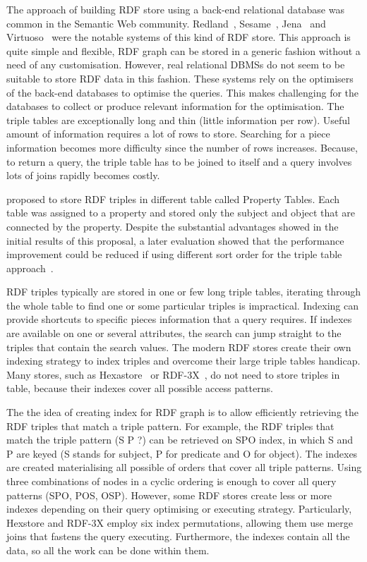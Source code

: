 {The approach of building RDF store using a back-end relational database was common in the Semantic Web community. 
Redland~\citep{Beckett:2001}, Sesame~\citep{Broekstra:2002}, Jena~\citep{Wilkinson:2003} and Virtuoso~\citep{Erling:2009} were the notable systems of this kind of RDF store.
This approach is quite simple and flexible, RDF graph can be stored in a generic fashion without a need of any customisation.
However, real relational DBMSs do not seem to be suitable to store RDF data in this fashion.
These systems rely on the optimisers of the back-end databases to optimise the queries.
This makes challenging for the databases to collect or produce relevant information for the optimisation.
The triple tables are exceptionally long and thin (little information per row). 
Useful amount of information requires a lot of rows to store.
Searching for a piece information becomes more difficulty since the number of rows increases.
Because, to return a query, the triple table has to be joined to itself and a query involves lots of joins rapidly becomes costly.

\cite{Abadi:2007} proposed to store RDF triples in different table called Property Tables.
Each table was assigned to a property and stored only the subject and object that are connected by the property. 
Despite the substantial advantages showed in the initial results of this proposal, a later evaluation showed that the performance improvement could be reduced if using different sort order  for the triple table approach~\citep{Schmidt:2008}.

RDF triples typically are stored in one or few long triple tables, iterating through the whole table to find one or some particular triples is impractical. 
Indexing can provide shortcuts to specific pieces information that a query requires. 
If indexes are available on one or several attributes, the search can jump straight to the triples that contain the search values.
The modern RDF stores create their own indexing strategy to index triples and overcome their large triple tables handicap.
Many stores, such as Hexastore~\citep{Weiss:2008} or RDF-3X~\citep{Neumann:2010}, do not need to store triples in table, because their indexes cover all possible access patterns.

The the idea of creating index for RDF graph is to allow efficiently retrieving the RDF triples that match a triple pattern. 
For example, the RDF triples that match the triple pattern (S P ?) can be retrieved on SPO index, in which S and P are keyed (S stands for subject, P for predicate and O for object).
The indexes are created materialising all possible of orders that cover all triple patterns.
Using three combinations of nodes in a cyclic ordering is enough to cover all query patterns (SPO, POS, OSP).
However, some RDF stores create less or more indexes depending on their query optimising or executing strategy.
Particularly, Hexstore and RDF-3X employ six index permutations, allowing them use merge joins that fastens the query executing.
Furthermore, the indexes contain all the data, so all the work can be done within them.

}
